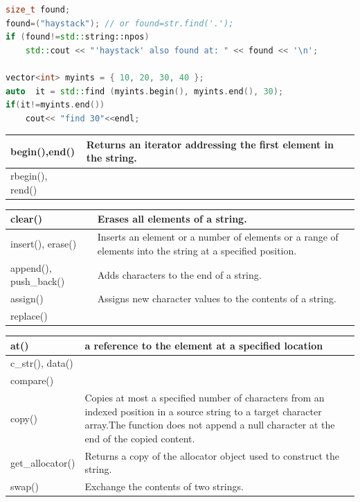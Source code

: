 \documentclass[a4paper,11pt,twoside]{book}
\newcommand{\tophline}{\hline }
\newcommand{\bottomhline}{\\ \hline }
\newcommand{\tophline}{ }
\newcommand{\bottomhline}{ }
\begin{document}
\begin{itemize}
\begin{lstlisting}[frame=single, language=c++]
size_t found;
found=("haystack"); // or found=str.find('.');
if (found!=std::string::npos)
	std::cout << "'haystack' also found at: " << found << '\n';
	
vector<int> myints = { 10, 20, 30, 40 };
auto  it = std::find (myints.begin(), myints.end(), 30);
if(it!=myints.end())
	cout<< "find 30"<<endl;
\end{lstlisting}
	
	
	\begin{tabular}{| p{} |p{}|}
		\tophline
		begin(),end() & Returns an iterator addressing the first element in the string.\\
		\tophline
		rbegin(), rend() & \bottomhline
		
	\end{tabular}
	
	\begin{tabular}{| p{} |p{}|}
		\tophline
		clear()& Erases all elements of a string.\\
		\tophline
		insert(), erase() & Inserts an element or a number of elements or a range of elements into the string at a specified position.\\
		\tophline
		append(), push\_back() & Adds characters to the end of a string.\\
		\tophline
		assign() &Assigns new character values to the contents of a string.\\
		\tophline
		replace() & \bottomhline
	\end{tabular}
	
	\begin{tabular}{| p{} |p{}|}
		
		\tophline
		at() & a reference to the element at a specified location \\
		\tophline
		c\_str(), data() & \\
		\tophline
		compare()& \\
		\tophline
		copy() & Copies at most a specified number of characters from an indexed position in a source string to a target character array.The function does not append a null character at the end of the copied content.
		\\
		\tophline
		get\_allocator() & Returns a copy of the allocator object used to construct the string.\\
		
		\tophline
		swap() & Exchange the contents of two strings. \bottomhline
	\end{tabular}
	

\end{itemize}
\end{document}
